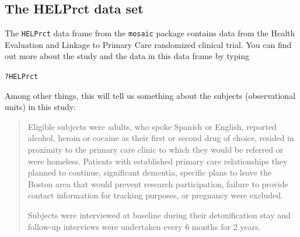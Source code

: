 \documentclass[twoside]{book}\usepackage[]{graphicx}\usepackage[]{xcolor}
\makeatletter
\newcommand{\hlopt}[1]{\textcolor[rgb]{0,0,0}{#1}}%
\newcommand{\hlstd}[1]{\textcolor[rgb]{0.345,0.345,0.345}{#1}}%
\newenvironment{kframe}{%
 \def\at@end@of@kframe{}%
 \ifinner\ifhmode%
  \def\at@end@of@kframe{\end{minipage}}%
  \begin{minipage}{\columnwidth}%
 \fi\fi%
 \def\FrameCommand##1{\hskip\@totalleftmargin \hskip-\fboxsep
 \colorbox{shadecolor}{##1}\hskip-\fboxsep
     \hskip-\linewidth \hskip-\@totalleftmargin \hskip\columnwidth}%
 \MakeFramed {\advance\hsize-\width
   \@totalleftmargin\z@ \linewidth\hsize
   \@setminipage}}%
 {\par\unskip\endMakeFramed%
 \at@end@of@kframe}
\newenvironment{knitrout}{}{} %
\newcommand{\Rindex}[1]{\index{\texttt{#1}}}
\newcommand{\dataframe}[1]{{\color{blue!80!black}\texttt{#1}}\Rindex{#1}}
\newcommand{\pkg}[1]{{\color{red!80!black}\texttt{#1}}\Rindex{#1}}
\makeatother
\begin{document}
\subsection{The HELPrct data set}
The \dataframe{HELPrct} data frame from the \pkg{mosaic} package
contains data from the Health Evaluation and Linkage to Primary Care
randomized clinical trial.  You can find out more about the study and
the data in this data frame by typing
\begin{knitrout}
\color{fgcolor}\begin{kframe}
\begin{alltt}
\hlopt{?}\hlstd{HELPrct}
\end{alltt}
\end{kframe}
\end{knitrout}

Among other things, this will tell us something about the subjects (observational units) in
this study:
\begin{quote}
	Eligible subjects were adults, who spoke Spanish or English, reported
	alcohol, heroin or cocaine as their first or second drug of choice, resided
	in proximity to the primary care clinic to which they would be referred or
	were homeless. Patients with established primary care relationships they
	planned to continue, significant dementia, specific plans to leave the
	Boston area that would prevent research participation, failure to provide
	contact information for tracking purposes, or pregnancy were excluded.

Subjects were interviewed at baseline during their detoxification stay and
follow-up interviews were undertaken every 6 months for 2 years.
\end{quote}
\end{document}
